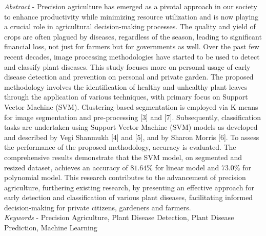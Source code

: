 \documentclass[twocolumn,10pt]{article}
\begin{document}
\begin{multicols}{2}
\begin{flushleft}
\justifying

\textit{Abstract} - Precision agriculture has emerged as a pivotal approach in our society to enhance productivity while minimizing resource utilization and is now playing a crucial role in agricultural decision-making processes. The quality and yield of crops are often plagued by diseases, regardless of the season, leading to significant financial loss, not just for farmers but for governments as well. Over the past few recent decades, image processing methodologies have started to be used to detect and classify plant diseases. This study focuses more on personal usage of early disease detection and prevention on personal and private garden. The proposed methodology involves the identification of healthy and unhealthy plant leaves through the application of various techniques, with primary focus on Support Vector Machine (SVM). Clustering-based segmentation is employed via K-means for image segmentation and pre-processing [3] and [7]. Subsequently, classification tasks are undertaken using Support Vector Machine (SVM) models as developed and described by Vegi Shanmukh [4] and [5], and by Sharon Morris [6]. To assess the performance of the proposed methodology, accuracy is evaluated. The comprehensive results demonstrate that the SVM model, on segmented and resized dataset, achieves an accuracy of $81.64\%$ for linear model and $73.0\%$ for polynomial model. This research contributes to the advancement of precision agriculture, furthering existing research, by presenting an effective approach for early detection and classification of various plant diseases, facilitating informed decision-making for private citizens, gardeners and farmers.\\
\textit{Keywords} - Precision Agriculture, Plant Disease Detection, Plant Disease Prediction, Machine Learning
	

\end{flushleft}
\end{multicols}
\end{document}
